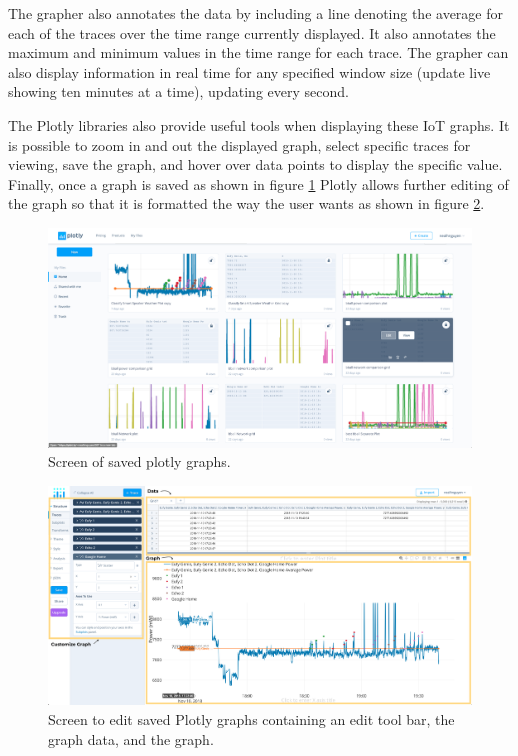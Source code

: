 The grapher also annotates the data by including a line denoting the average for each of the traces over the time range currently displayed. It also annotates the maximum and minimum values in the time range for each trace. The grapher can also display information in real time for any specified window size (update live showing ten minutes at a time), updating every second.

The Plotly libraries also provide useful tools when displaying these IoT graphs. It is possible to zoom in and out the displayed graph, select specific traces for viewing, save the graph, and hover over data points to display the specific value. Finally, once a graph is saved as shown in figure \ref{fig:plotlySave} Plotly allows further editing of the graph so that it is formatted the way the user wants as shown in figure \ref{fig:plotlyEdit}.

\begin{figure}[H]
    \centering
    \includegraphics[width=1\textwidth]{figures/plotlySave.png}
    \caption{Screen of saved plotly graphs.}
    \label{fig:plotlySave}
\end{figure}

\begin{figure}[H]
    \centering
    \includegraphics[width=1\textwidth]{figures/plotlyEdit.png}
    \caption{Screen to edit saved Plotly graphs containing an edit tool bar, the graph data, and the graph.}
    \label{fig:plotlyEdit}
\end{figure}

